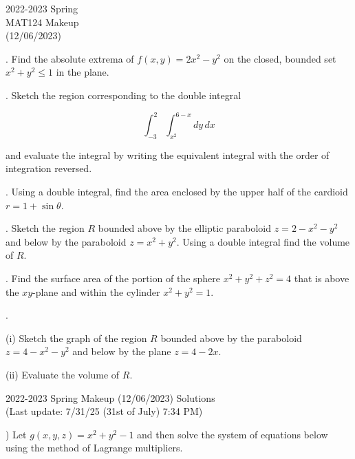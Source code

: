 \documentclass{article}
\begin{document}
\pagestyle{empty}
\large

\begin{center}
2022-2023 Spring \\MAT124 Makeup\\(12/06/2023)
\end{center}

. Find the absolute extrema of $f(x,y) = 2x^2-y^2$ on the closed, bounded set $x^2+y^2\leq1$ in the plane.

\hfill

. Sketch the region corresponding to the double integral

\begin{equation*}\int_{-3}^2\int_{x^2}^{6-x}dy\,dx\end{equation*}

\hfill

\noindent and evaluate the integral by writing the equivalent integral with the order of integration reversed.

\hfill

. Using a double integral, find the area enclosed by the upper half of the cardioid $r=1+\sin\theta$.

\hfill

. Sketch the region $R$ bounded above by the elliptic paraboloid $z=2-x^2-y^2$ and below by the paraboloid $z=x^2+y^2$. Using a double integral find the volume of $R$.

\hfill

. Find the surface area of the portion of the sphere $x^2+y^2+z^2=4$ that is above the $xy$-plane and within the cylinder $x^2+y^2=1$.

\hfill

.

\hfill

\noindent (i) Sketch the graph of the region $R$ bounded above by the paraboloid $z=4-x^2-y^2$ and below by the plane $z=4-2x$.

\hfill

\noindent (ii) Evaluate the volume of $R$.

\newpage

\begin{center}
2022-2023 Spring Makeup (12/06/2023) Solutions\\
(Last update: 7/31/25 (31st of July) 7:34 PM)
\end{center}

) Let $g(x,y,z)=x^2+y^2-1$ and then solve the system of equations below using the method of Lagrange multipliers.
\end{document}
